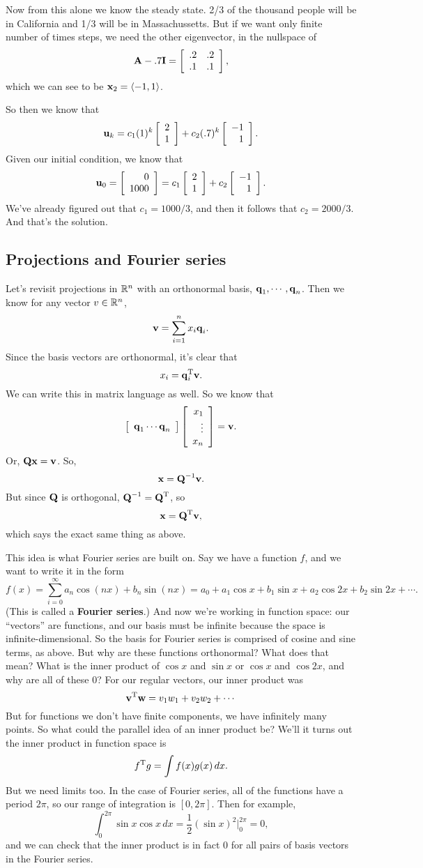 Now from this alone we know the steady state. 2/3 of the thousand people will be in California and 1/3 will be in Massachussetts. But if we want only finite number of times steps, we need the other eigenvector, in the nullspace of
\[ \boldsymbol{\mathbf{A}} - .7\boldsymbol{\mathbf{I}} = \left[ \begin{array}{rrrrrrrrrrrrrrrrrrrrrrrrr} .2&.2\\.1&.1\\ \end{array} \right], \]
which we can see to be $\boldsymbol{\mathbf{x}}_2 = \langle -1,1 \rangle$. 

So then we know that
\[ \boldsymbol{\mathbf{u}}_k = c_1(1)^k\left[ \begin{array}{rrrrrrrrrrrrrrrrrrrrrrrrr} 2\\1\\ \end{array} \right] + c_2(.7)^k\left[ \begin{array}{rrrrrrrrrrrrrrrrrrrrrrrrr} -1\\1\\ \end{array} \right]. \]
Given our initial condition, we know that
\[ \boldsymbol{\mathbf{u}}_0 = \left[ \begin{array}{rrrrrrrrrrrrrrrrrrrrrrrrr} 0\\1000\\ \end{array} \right] = c_1\left[ \begin{array}{rrrrrrrrrrrrrrrrrrrrrrrrr} 2\\1\\ \end{array} \right] + c_2\left[ \begin{array}{rrrrrrrrrrrrrrrrrrrrrrrrr} -1\\1\\ \end{array} \right]. \]
We've already figured out that $c_1 = 1000/3$, and then it follows that $c_2 = 2000/3$. And that's the solution. 

\subsection{Projections and Fourier series}

Let's revisit projections in $\mathbb{R}^n$ with an orthonormal basis, $\boldsymbol{\mathbf{q}}_1, \cdots, \boldsymbol{\mathbf{q}}_n$. Then we know for any vector $v \in \mathbb{R}^n$,
\[ \boldsymbol{\mathbf{v}} = \sum_{i=1}^n x_i \boldsymbol{\mathbf{q}}_i. \]
Since the basis vectors are orthonormal, it's clear that 
\[ x_i = \boldsymbol{\mathbf{q}}_i^\mathrm{T} \boldsymbol{\mathbf{v}}. \]
We can write this in matrix language as well. So we know that
\[ \left[ \begin{array}{rrrrrrrrrrrrrrrrrrrrrrrrr} \boldsymbol{\mathbf{q}}_1 \cdots \boldsymbol{\mathbf{q}}_n\\ \end{array} \right] \left[ \begin{array}{rrrrrrrrrrrrrrrrrrrrrrrrr} x_1\\\vdots\\x_n\\ \end{array} \right] = \boldsymbol{\mathbf{v}}. \]
Or, $\boldsymbol{\mathbf{Q}} \boldsymbol{\mathbf{x}} = \boldsymbol{\mathbf{v}}$. So,
\[ \boldsymbol{\mathbf{x}} = \boldsymbol{\mathbf{Q}}^{-1} \boldsymbol{\mathbf{v}}. \]
But since $\boldsymbol{\mathbf{Q}}$ is orthogonal, $\boldsymbol{\mathbf{Q}}^{-1} = \boldsymbol{\mathbf{Q}}^\mathrm{T}$, so
\[ \boldsymbol{\mathbf{x}} = \boldsymbol{\mathbf{Q}}^\mathrm{T} \boldsymbol{\mathbf{v}}, \]
which says the exact same thing as above.

This idea is what Fourier series are built on. Say we have a function $f$, and we want to write it in the form
\[ f(x) =  \sum_{i=0}^\infty a_n \cos (nx) + b_n \sin (nx) = a_0 + a_1 \cos x + b_1 \sin x + a_2 \cos 2x + b_2 \sin 2x + \cdots. \]
(This is called a \textbf{Fourier series}.) And now we're working in function space: our ``vectors'' are functions, and our basis must be infinite because the space is infinite-dimensional. So the basis for Fourier series is comprised of cosine and sine terms, as above. But why are these functions orthonormal? What does that mean? What is the inner product of $\cos x$ and $\sin x$ or $\cos x$ and $\cos 2x$, and why are all of these 0? For our regular vectors, our inner product was 
\[ \boldsymbol{\mathbf{v}}^\mathrm{T} \boldsymbol{\mathbf{w}} = v_1w_1 + v_2w_2 + \cdots \]
But for functions we don't have finite components, we have infinitely many points. So what could the parallel idea of an inner product be? We'll it turns out the inner product in function space is
\[ f^\mathrm{T} g = \int f(x)g(x)\,dx. \]
But we need limits too. In the case of Fourier series, all of the functions have a period $2 \pi$, so our range of integration is $[0,2\pi]$. Then for example,
\[ \int_0^{2\pi} \sin x \cos x\, dx = \frac 12 (\sin x)^2 \bigg|_0^{2\pi} = 0, \]
and we can check that the inner product is in fact 0 for all pairs of basis vectors in the Fourier series. 

